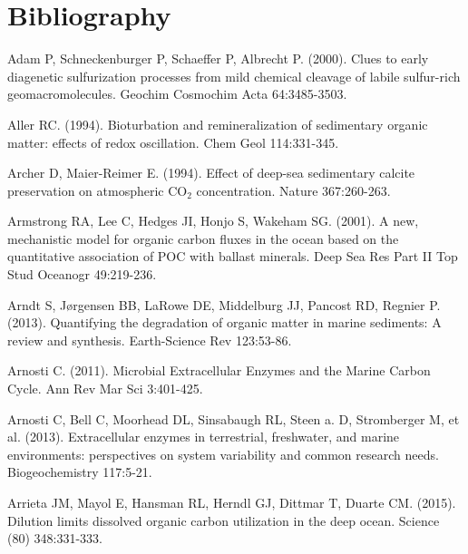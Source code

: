 \chapter*{Bibliography}





Adam P, Schneckenburger P, Schaeffer P, Albrecht P. (2000). Clues to early diagenetic sulfurization processes from mild chemical cleavage of labile sulfur-rich geomacromolecules. Geochim Cosmochim Acta 64:3485-3503.

Aller RC. (1994). Bioturbation and remineralization of sedimentary organic matter: effects of redox oscillation. Chem Geol 114:331-345.

Archer D, Maier-Reimer E. (1994). Effect of deep-sea sedimentary calcite preservation on atmospheric CO$_2$ concentration. Nature 367:260-263.

Armstrong RA, Lee C, Hedges JI, Honjo S, Wakeham SG. (2001). A new, mechanistic model for organic carbon fluxes in the ocean based on the quantitative association of POC with ballast minerals. Deep Sea Res Part II Top Stud Oceanogr 49:219-236.

Arndt S, J{\o}rgensen BB, LaRowe DE, Middelburg JJ, Pancost RD, Regnier P. (2013). Quantifying the degradation of organic matter in marine sediments: A review and synthesis. Earth-Science Rev 123:53-86.

Arnosti C. (2011). Microbial Extracellular Enzymes and the Marine Carbon Cycle. Ann Rev Mar Sci 3:401-425.

Arnosti C, Bell C, Moorhead DL, Sinsabaugh RL, Steen a. D, Stromberger M, et al. (2013). Extracellular enzymes in terrestrial, freshwater, and marine environments: perspectives on system variability and common research needs. Biogeochemistry 117:5-21.

Arrieta JM, Mayol E, Hansman RL, Herndl GJ, Dittmar T, Duarte CM. (2015). Dilution limits dissolved organic carbon utilization in the deep ocean. Science (80) 348:331-333.


